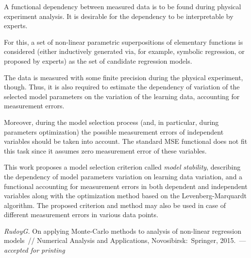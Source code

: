 \documentclass[twoside]{article}
\begin{document}
A functional dependency between measured data is to be found during physical
experiment analysis. It is desirable for the dependency to be interpretable
by experts.

For this, a set of non-linear parametric superpositions of elementary functions
is considered (either inductively generated via, for example, symbolic
regression, or proposed by experts) as the set of candidate regression models.

The data is measured with some finite precision during the physical
experiment, though. Thus, it is also required to estimate the dependency of
variation of the selected model parameters on the variation of the learning
data, accounting for measurement errors.

Moreover, during the model selection process (and, in particular, during
parameters optimization) the possible measurement errors of independent
variables should be taken into account. The standard MSE functional does not
fit this task since it assumes zero measurement error of these variables.

This work proposes a model selection criterion called \emph{model stability},
describing the dependency of model parameters variation on learning data variation,
and a functional accounting for measurement errors in both dependent and
independent variables along with the optimization method based on the Levenberg-Marquardt algorithm.
The proposed criterion and method may also be used in case of different measurement
errors in various data points.

\begin{thebibliography}{1}
    \emph{Rudoy\;G.}
    On applying Monte-Carlo methods to analysis of non-linear regression models~//
    Numerical Analysis and Applications,
	Novosibirsk:~Springer, 2015.~--- \emph{accepted for printing}
\end{thebibliography}
\end{document}
